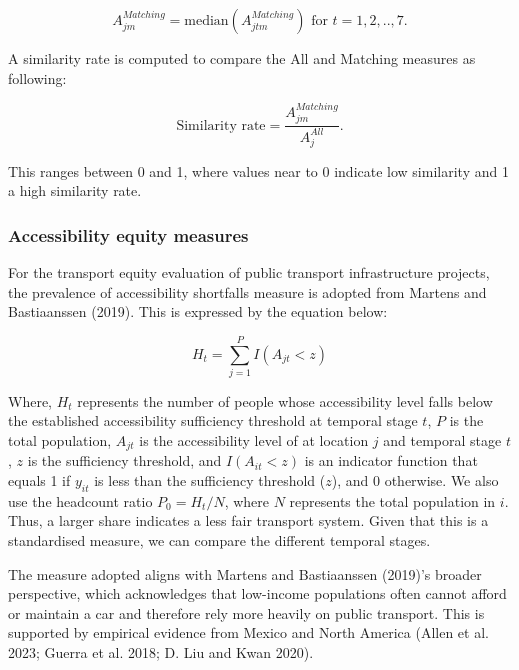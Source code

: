 \documentclass{article}
\begin{document}
\begin{equation} 
  A^{Matching}_{jm} = \text{median}(A^{Matching}_{jtm}) \text{ for } t= 1,2,..,7. 
\label{eq:median-accessibility-matching}
\end{equation}

A similarity rate is computed to compare the All and Matching measures
as following:

\begin{equation} 
  \text{Similarity rate} = \frac{  A^{Matching}_{jm} } { A^{All}_{j} }.
\label{eq:similarity-rate}
\end{equation}

This ranges between 0 and 1, where values near to 0 indicate low
similarity and 1 a high similarity rate.

\subsubsection{Accessibility equity
measures}\label{accessibility-equity-measures}

For the transport equity evaluation of public transport infrastructure
projects, the prevalence of accessibility shortfalls measure is adopted
from Martens and Bastiaanssen (2019). This is expressed by the equation
below:

\begin{equation}
  H_t = \sum^{P}_{j=1} I(A_{jt} < z)
\label{eq:accessibility-shortfalls}
\end{equation}

Where, \(H_t\) represents the number of people whose accessibility level
falls below the established accessibility sufficiency threshold at
temporal stage \(t\), \(P\) is the total population, \(A_{jt}\) is the
accessibility level of at location \(j\) and temporal stage \(t\), \(z\)
is the sufficiency threshold, and \(I(A_{it} < z)\) is an indicator
function that equals 1 if \(y_{it}\) is less than the sufficiency
threshold (\(z\)), and 0 otherwise. We also use the headcount ratio
\(P_0 = H_t / N\), where \(N\) represents the total population in \(i\).
Thus, a larger share indicates a less fair transport system. Given that
this is a standardised measure, we can compare the different temporal
stages.

The measure adopted aligns with Martens and Bastiaanssen (2019)'s
broader perspective, which acknowledges that low-income populations
often cannot afford or maintain a car and therefore rely more heavily on
public transport. This is supported by empirical evidence from Mexico
and North America (Allen et al. 2023; Guerra et al. 2018; D. Liu and
Kwan 2020).
\end{document}
